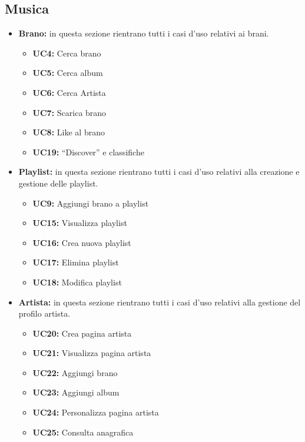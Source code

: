 \subsection{Musica}
\begin{itemize}
    \item \textbf{Brano:} in questa sezione rientrano tutti i casi d'uso relativi ai brani.
    \begin{itemize}
        \item \textbf{UC4:} Cerca brano
        \item \textbf{UC5:} Cerca album
        \item \textbf{UC6:} Cerca Artista
        \item \textbf{UC7:} Scarica brano
        \item \textbf{UC8:} Like al brano
        \item \textbf{UC19:} ``Discover'' e classifiche
    \end{itemize} 
    
    \item \textbf{Playlist:} in questa sezione rientrano tutti i casi d'uso relativi alla creazione e gestione delle playlist.
    \begin{itemize}
        \item \textbf{UC9:} Aggiungi brano a playlist
        \item \textbf{UC15:} Visualizza playlist 
        \item \textbf{UC16:} Crea nuova playlist 
        \item \textbf{UC17:} Elimina playlist
        \item \textbf{UC18:} Modifica playlist
    \end{itemize}
    
    \item \textbf{Artista:} in questa sezione rientrano tutti i casi d'uso relativi alla gestione del profilo artista.
    \begin{itemize}
        \item  \textbf{UC20:} Crea pagina artista 
        \item  \textbf{UC21:} Visualizza pagina artista 
        \item  \textbf{UC22:} Aggiungi brano 
        \item  \textbf{UC23:} Aggiungi album 
        \item  \textbf{UC24:} Personalizza pagina artista 
        \item  \textbf{UC25:} Consulta anagrafica
    \end{itemize} 
\end{itemize}

